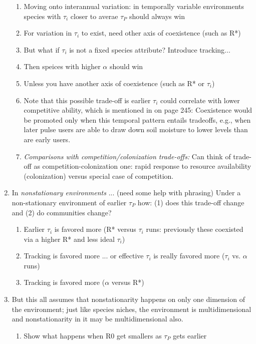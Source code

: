\documentclass[11pt,letterpaper]{article}
\begin{document}
\begin{enumerate}
\begin{enumerate}
\item Moving onto interannual variation: in temporally variable environments species with $\tau_i$ closer to averae $\tau_{P}$ should always win
\item For variation in $\tau_i$ to exist, need other axis of coexistence (such as R*)
\item But what if $\tau_i$ is not a fixed species attribute? Introduce tracking...
\item Then speices with higher $\alpha$ should win
\item Unless you have another axis of coexistence (such as R* or $\tau_i$)
\item Note that this possible trade-off is earlier \(\tau_{i}\) could correlate with lower competitive ability, which is mentioned in \citet{Chesson:2004eo} on page 245: Coexistence would be promoted
only when this temporal pattern entails tradeoffs, e.g.,
when later pulse users are able to draw down soil moisture
to lower levels than are early users.
\item \emph{Comparisons with competition/colonization trade-offs:} Can think of trade-off as competition-colonization one: rapid response to resource availability (colonization) versus special case of competition.\\
\end{enumerate}
\item In \emph{nonstationary environments} ... (need some help with phrasing)
% 
Under a non-stationary environment of earlier $\tau_P$ how: (1) does this trade-off change and (2) do communities change?
\begin{enumerate}
\item Earlier $\tau_i$ is favored more (R* versus $\tau_i$ runs: previously these coexisted via a higher R* and less ideal $\tau_i$)
\item Tracking is favored more ... or effective $\tau_i$ is really favored more ($\tau_i$ vs. $\alpha$ runs)
\item Tracking is favored more ($\alpha$ versus R*)
\end{enumerate}
\item But this all assumes that nonstationarity happens on only one dimension of the environment; just like species niches, the environment is multidimensional and nonstationarity in it may be multidimensional also. 
\begin{enumerate}
\item Show what happens when R0 get smallers as $\tau_{P}$ gets earlier
\end{enumerate}

\end{enumerate}
\end{document}
